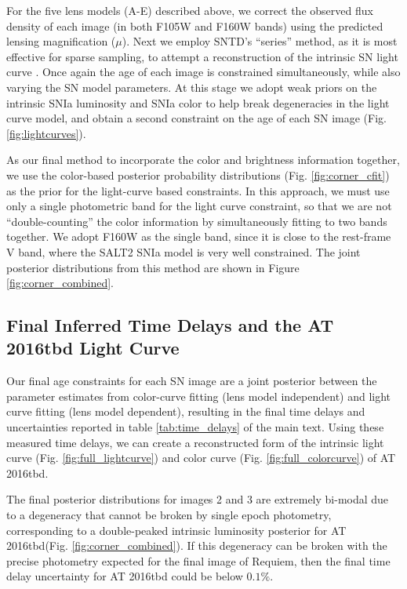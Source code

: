 \documentclass[12pt]{article}
\def\SNABC{AT 2016tbd\xspace}
\begin{document}
For the five lens models (A-E) described above, we correct the observed flux density of each image (in both F105W and F160W bands) using the predicted lensing magnification ($\mu$). Next we employ SNTD's ``series'' method, as it is most effective for sparse sampling, to attempt a reconstruction of the intrinsic SN light curve \cite{pierel_turning_2019}. Once again the age of each image is constrained simultaneously, while also varying the SN model parameters. At this stage we adopt weak priors on the intrinsic SNIa luminosity \cite{wang_determination_2006} and SNIa color \cite{mosher_cosmological_2014} to help break degeneracies in the light curve model, and obtain a second constraint on the age of each SN image (Fig. \ref{fig:lightcurves}). 


As our final method to incorporate the color and brightness information together, we use the color-based posterior probability distributions (Fig. \ref{fig:corner_cfit}) as the prior for 
the light-curve based constraints. In this approach, we must use only a single photometric band for the light curve constraint, so that we are not ``double-counting'' the color information by simultaneously fitting to two bands together.  We adopt F160W as the single band, since it is close to the rest-frame V band, where the SALT2 SNIa model is very well constrained.  The joint posterior distributions from this method are shown in Figure \ref{fig:corner_combined}.  

\subsection*{Final Inferred Time Delays and the \SNABC Light Curve}

Our final age constraints for each SN image are a joint posterior between the parameter estimates from color-curve fitting (lens model independent) and light curve fitting (lens model dependent), resulting in the final time delays and uncertainties reported in table \ref{tab:time_delays} of the main text. Using these measured time delays, we can create a reconstructed form of the intrinsic light curve (Fig. \ref{fig:full_lightcurve}) and color curve (Fig. \ref{fig:full_colorcurve}) of \SNABC.


The final posterior distributions for images 2 and 3 are extremely bi-modal due to a degeneracy that cannot be broken by single epoch photometry, corresponding to a double-peaked intrinsic luminosity posterior for \SNABC (Fig. \ref{fig:corner_combined}). If this degeneracy can be broken with the precise photometry expected for the final image of Requiem, then the final time delay uncertainty for \SNABC could be below $0.1\%$.
\end{document}
